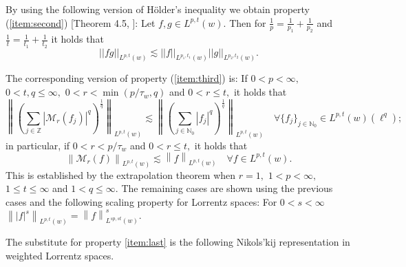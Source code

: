 \documentclass[10pt,a4paper]{article}
\theoremstyle{remark}
\newcommand{\na}{\mathbb{N}}
\newcommand{\ent}{\mathbb{Z}}
\newcommand{\lebw}[2]{L^{#1}(#2)} %
\newcommand{\M}{\mathcal{M}} %
\newcommand{\abs}[1]{\left\vert #1 \right\vert}
\newcommand{\norm}[2]{\left\|#1\right\|_{#2}}
\begin{document}
By using the following version of H\"older's inequality we obtain property (\ref{item:second}) [Theorem 4.5, \cite{MR0223874}]: Let $f,g\in \lebw{p,t}{w}$. Then for $\frac{1}{p} = \frac{1}{p_1} + \frac{1}{p_2}$ and $\frac{1}{t} = \frac{1}{t_1} + \frac{1}{t_2}$ it holds that \[||fg||_{\lebw{p,t}{w}} \lesssim ||f||_{\lebw{p_1,t_1}{w}}||g||_{\lebw{p_2,t_2}{w}} .\]

The corresponding version of property (\ref{item:third}) is: 
 If $0<p<\infty,$  $0<t,q\le\infty,$  $0<r<\min(p/\tau_w,q)$ and $0<r\le t,$ it holds that
\begin{equation}\label{eq:FTLorentz}
\norm{\left(\sum_{j\in\ent} \abs{\M_r(f_j)}^q\right)^{\frac{1}{q}}}{\lebw{p,t}{w}}\lesssim \norm{\left(\sum_{j\in\na_0} \abs{f_j}^q\right)^{\frac{1}{q}}}{\lebw{p,t}{w}}\quad \forall \{f_j\}_{j\in \na_0}\in \lebw{p,t}{w}(\ell^q);  
\end{equation}
in particular, if $0<r<p/\tau_w$ and $0<r\le t,$ it holds that 
\begin{equation*}
\norm{\M_r(f)}{\lebw{p,t}{w}}\lesssim \norm{f}{\lebw{p,t}{w}}\quad \forall f\in \lebw{p,t}{w}. 
\end{equation*}
This is established by the extrapolation theorem \cite[Theorem 4.10 and comments on page 70]{MR2797562} when $r=1,$ $1<p<\infty,$  $1\le t\le \infty$ and $1<q\le \infty.$ The remaining cases are shown using the previous cases and the following scaling property for Lorrentz spaces: For $0<s<\infty$ $\norm{\abs{f}^s}{\lebw{p,t}{w}}=\norm{f}{\lebw{sp,st}{w}}^s$.

The substitute for property \ref{item:last} is the following Nikols'kij representation in weighted Lorrentz spaces.
\end{document}
